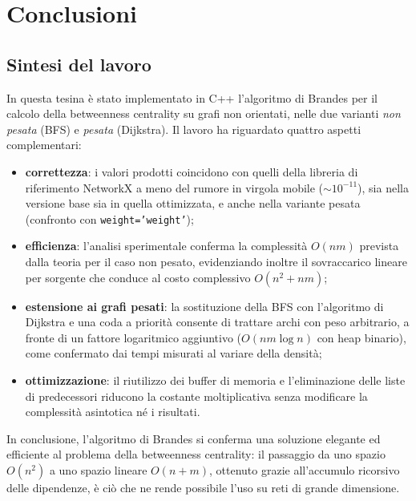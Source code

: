 \documentclass[11pt,a4paper]{report}
\begin{document}
\chapter{Conclusioni}

\section{Sintesi del lavoro}

In questa tesina è stato implementato in C++ l'algoritmo di Brandes per il
calcolo della betweenness centrality su grafi non orientati, nelle due varianti
\emph{non pesata} (BFS) e \emph{pesata} (Dijkstra). Il
lavoro ha riguardato quattro aspetti complementari:
\begin{itemize}
	\item \textbf{correttezza}: i valori prodotti coincidono con quelli della
	      libreria di riferimento NetworkX a meno del rumore in virgola mobile
	      ($\sim 10^{-11}$), sia nella versione base sia in quella ottimizzata,
	      e anche nella variante pesata (confronto con \texttt{weight='weight'});
	\item \textbf{efficienza}: l'analisi sperimentale conferma la complessità
	      $O(nm)$ prevista dalla teoria per il caso non pesato, evidenziando
	      inoltre il sovraccarico lineare per sorgente che conduce al costo
	      complessivo $O(n^2+nm)$;
	\item \textbf{estensione ai grafi pesati}: la sostituzione della BFS con
	      l'algoritmo di Dijkstra e una coda a priorità consente di
	      trattare archi con peso arbitrario, a fronte di un fattore logaritmico
	      aggiuntivo ($O(nm\log n)$ con heap binario), come confermato dai tempi
	      misurati al variare della densità;
	\item \textbf{ottimizzazione}: il riutilizzo dei buffer di memoria e
	      l'eliminazione delle liste di predecessori riducono la costante
	      moltiplicativa senza modificare la complessità asintotica né i risultati.
\end{itemize}

In conclusione, l'algoritmo di Brandes si conferma una soluzione elegante ed
efficiente al problema della betweenness centrality: il passaggio da uno spazio
$O(n^2)$ a uno spazio lineare $O(n+m)$, ottenuto grazie all'accumulo ricorsivo
delle dipendenze, è ciò che ne rende possibile l'uso su reti di grande
dimensione.
\end{document}
